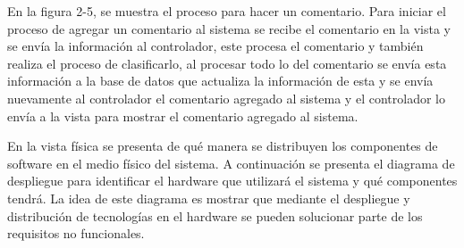 \documentclass{memoria}
\begin{document}

En la figura 2-5, se muestra el proceso para hacer un comentario. Para iniciar el proceso de agregar un comentario al sistema se recibe el comentario en la vista y se envía la información al controlador, este procesa el comentario y también realiza el proceso de clasificarlo, al procesar todo lo del comentario se envía esta información a la base de datos que actualiza la información de esta y se envía nuevamente al controlador el comentario agregado al sistema y el controlador lo envía a la vista para mostrar el comentario agregado al sistema.

\newpage
{}

En la vista física se presenta de qué manera se distribuyen los componentes de software en el medio físico del sistema. A continuación se presenta el diagrama de despliegue para identificar el hardware que utilizará el sistema y qué componentes tendrá. La idea de este diagrama es mostrar que mediante el despliegue y distribución de tecnologías en el hardware se pueden solucionar parte de los requisitos no funcionales.

\end{document}
